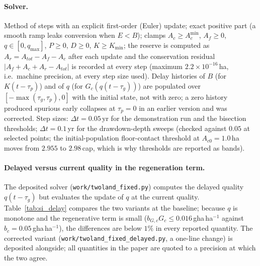 \documentclass[11pt,a4paper]{article}
\newcommand{\Acmin}{A_c^{\min}}
\begin{document}
\paragraph{Solver.} Method of steps with an explicit first-order (Euler) update; exact positive part (a smooth ramp leaks conversion when $E<B$); clamps $A_c\ge\Acmin$, $A_f\ge0$, $q\in[0,q_{\max}]$, $P\ge0$, $D\ge0$, $K\ge K_{\min}$; the reserve is computed as $A_r=A_{tot}-A_f-A_c$ after each update and the conservation residual $|A_f+A_c+A_r-A_{tot}|$ is recorded at every step (maximum $2.2\times10^{-16}$\,ha, i.e.\ machine precision, at every step size used). Delay histories of $B$ (for $K(t-\tau_p)$) and of $q$ (for $G_c(q(t-\tau_g))$) are populated over $[-\max(\tau_g,\tau_p),0]$ with the initial state, not with zero; a zero history produced spurious early collapses at $\tau_p=0$ in an earlier version and was corrected. Step sizes: $\Delta t=0.05$\,yr for the demonstration run and the bisection thresholds; $\Delta t=0.1$\,yr for the drawdown-depth sweeps (checked against $0.05$ at selected points; the initial-population floor-contact threshold at $A_{c0}=1.0$\,ha moves from $2.955$ to $2.98$\,cap, which is why thresholds are reported as bands).

\paragraph{Delayed versus current quality in the regeneration term.} The deposited solver (\texttt{work/twoland\_fixed.py}) computes the delayed quality $q(t-\tau_g)$ but evaluates the update of $q$ at the current quality. Table~\ref{tab:si_delay} compares the two variants at the baseline; because $q$ is monotone and the regenerative term is small ($b_{G,c}G_c\le0.016$\,gha\,ha$^{-1}$ against $b_c=0.05$\,gha\,ha$^{-1}$), the differences are below $1\%$ in every reported quantity. The corrected variant (\texttt{work/twoland\_fixed\_delayed.py}, a one-line change) is deposited alongside; all quantities in the paper are quoted to a precision at which the two agree.
\end{document}

